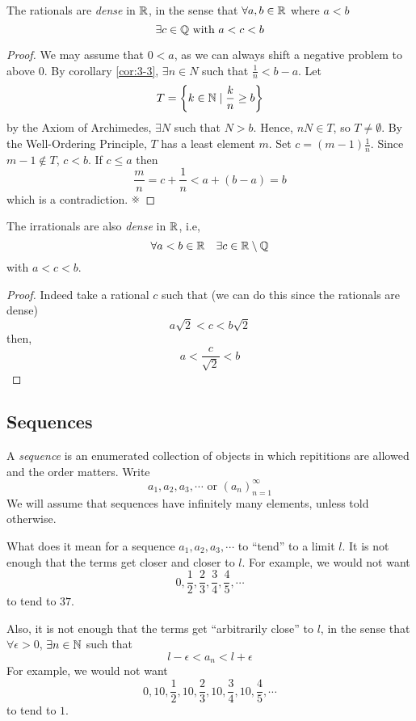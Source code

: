 \documentclass{article}
\begin{document}
\begin{prop}[Dense]
    The rationals are \emph{dense} in $\mathbb{R}$, in the sense that $\forall a, b \in \mathbb{R}$ where $a < b$
    \[
        \exists c \in \mathbb{Q} \text{ with } a < c < b
    \]
\end{prop}
\begin{proof}
    We may assume that $0 < a$, as we can always shift a negative problem to above $0$.
    By corollary \ref{cor:3-3}, $\exists n \in N$ such that $\frac{1}{n} < b - a$.
    Let
    \[
        T = \left\{ k \in \mathbb{N} \mid \frac{k}{n} \geq b \right\}  
    \]
    by the Axiom of Archimedes, $\exists N$ such that $N > b$.
    Hence, $nN \in T$, so $T \neq \emptyset$.
    By the Well-Ordering Principle, $T$ has a least element $m$.
    Set $c = (m-1) \frac{1}{n}$.
    Since $m -1 \notin T$, $c < b$.
    If $c \leq a$ then 
    \[
        \frac{m}{n} = c + \frac{1}{n} < a + (b - a) = b  
    \]
    which is a contradiction. $\contradiction$
\end{proof}

\begin{prop}
    The irrationals are also \emph{dense} in $\mathbb{R}$, i.e,
    \[
        \forall a < b \in \mathbb{R} \quad \exists c \in \mathbb{R} \setminus \mathbb{Q}  
    \]
    with $a < c < b$.
\end{prop}
\begin{proof}
    Indeed take a rational $c$ such that (we can do this since the rationals are dense)
    \[
        a \sqrt{2} < c < b \sqrt{2}  
    \]
    then,
    \[
        a < \frac{c}{\sqrt{2}} < b  
    \]
\end{proof}

\subsection{Sequences}
\begin{defi}
    A \emph{sequence} is an enumerated collection of objects in which repititions are allowed and the order matters. 
    Write 
    \[
        a_1, a_2, a_3, \cdots \text{ or } (a_n)_{n=1}^\infty  
    \]
    We will assume that sequences have infinitely many elements, unless told otherwise.
\end{defi}

What does it mean for a sequence $a_1, a_2, a_3, \cdots$ to ``tend'' to a limit $l$.
It is not enough that the terms get closer and closer to $l$. 
For example, we would not want
\[
    0, \frac{1}{2}, \frac{2}{3}, \frac{3}{4}, \frac{4}{5}, \cdots
\]
to tend to $37$.

Also, it is not enough that the terms get ``arbitrarily close'' to $l$, 
in the sense that $\forall \epsilon > 0$, $\exists n \in \mathbb{N}$ such that 
\[
    l - \epsilon < a_n < l + \epsilon
\]
For example, we would not want
\[
    0, 10, \frac{1}{2}, 10, \frac{2}{3}, 10, \frac{3}{4}, 10, \frac{4}{5}, \cdots
\]
to tend to $1$.
\end{document}

